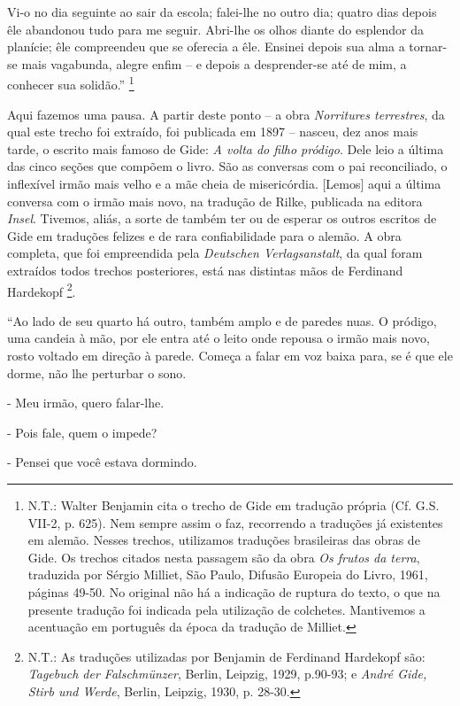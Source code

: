 Vi-o no dia seguinte ao sair da escola; falei-lhe no outro dia; quatro
dias depois êle abandonou tudo para me seguir. Abri-lhe os olhos diante
do esplendor da planície; êle compreendeu que se oferecia a êle. Ensinei
depois sua alma a tornar-se mais vagabunda, alegre enfim -- e depois a
desprender-se até de mim, a conhecer sua solidão.'' \footnote{N.T.:
  Walter Benjamin cita o trecho de Gide em tradução própria (Cf. G.S.
  VII-2, p. 625). Nem sempre assim o faz, recorrendo a traduções já
  existentes em alemão. Nesses trechos, utilizamos traduções brasileiras
  das obras de Gide. Os trechos citados nesta passagem são da obra
  \emph{Os frutos da terra}, traduzida por Sérgio Milliet, São Paulo,
  Difusão Europeia do Livro, 1961, páginas 49-50. No original não há a
  indicação de ruptura do texto, o que na presente tradução foi indicada
  pela utilização de colchetes. Mantivemos a acentuação em português da
  época da tradução de Milliet.}

Aqui fazemos uma pausa. A partir deste ponto -- a obra \emph{Norritures
terrestres}, da qual este trecho foi extraído, foi publicada em 1897 --
nasceu, dez anos mais tarde, o escrito mais famoso de Gide: \emph{A
volta do filho pródigo}. Dele leio a última das cinco seções que compõem
o livro. São as conversas com o pai reconciliado, o inflexível irmão
mais velho e a mãe cheia de misericórdia. {[}Lemos{]} aqui a última
conversa com o irmão mais novo, na tradução de Rilke, publicada na
editora \emph{Insel}. Tivemos, aliás, a sorte de também ter ou de
esperar os outros escritos de Gide em traduções felizes e de rara
confiabilidade para o alemão. A obra completa, que foi empreendida pela
\emph{Deutschen Verlagsanstalt}, da qual foram extraídos todos trechos
posteriores, está nas distintas mãos de Ferdinand Hardekopf \footnote{N.T.:
  As traduções utilizadas por Benjamin de Ferdinand Hardekopf são:
  \emph{Tagebuch der Falschmünzer}, Berlin, Leipzig, 1929, p.90-93; e
  \emph{André Gide, Stirb und Werde}, Berlin, Leipzig, 1930, p. 28-30.}.

``Ao lado de seu quarto há outro, também amplo e de paredes nuas. O
pródigo, uma candeia à mão, por ele entra até o leito onde repousa o
irmão mais novo, rosto voltado em direção à parede. Começa a falar em
voz baixa para, se é que ele dorme, não lhe perturbar o sono.

- Meu irmão, quero falar-lhe.

- Pois fale, quem o impede?

- Pensei que você estava dormindo.

